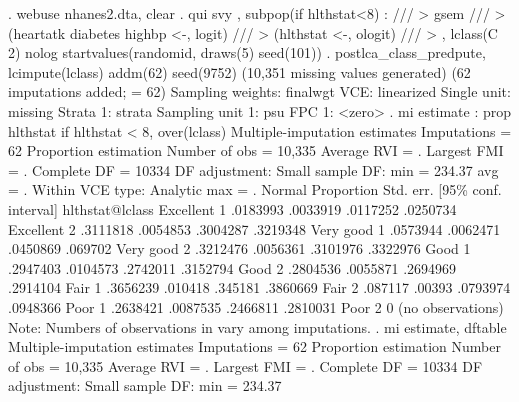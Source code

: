 . webuse nhanes2.dta, clear
{\smallskip}
. qui svy , subpop(if hlthstat<8) : ///
>         gsem ///
>                 (heartatk diabetes highbp <-, logit) ///
>                 (hlthstat <-, ologit) /// 
>         , lclass(C 2) nolog  startvalues(randomid, draws(5) seed(101)) 
{\smallskip}
. postlca_class_predpute, lcimpute(lclass) addm(62) seed(9752)
(10,351 missing values generated)
(62 imputations added; {} = 62)
{\smallskip}
Sampling weights: finalwgt
             VCE: linearized
     Single unit: missing
        Strata 1: strata
 Sampling unit 1: psu
           FPC 1: <zero>
{\smallskip}
. mi estimate : prop hlthstat if hlthstat < 8, over(lclass) 
{\smallskip}
Multiple-imputation estimates     Imputations     =         62
Proportion estimation             Number of obs   =     10,335
                                  Average RVI     =          .
                                  Largest FMI     =          .
                                  Complete DF     =      10334
DF adjustment:   Small sample     DF:     min     =     234.37
                                          avg     =          .
Within VCE type:     Analytic             max     =          .
{\smallskip}
                {\VBAR}                                   Normal
                {\VBAR} Proportion   Std. err.     [95\% conf. interval]
hlthstat@lclass {\VBAR}
   Excellent 1  {\VBAR}   .0183993   .0033919      .0117252    .0250734
   Excellent 2  {\VBAR}   .3111818   .0054853      .3004287    .3219348
   Very good 1  {\VBAR}   .0573944   .0062471      .0450869     .069702
   Very good 2  {\VBAR}   .3212476   .0056361      .3101976    .3322976
        Good 1  {\VBAR}   .2947403   .0104573      .2742011    .3152794
        Good 2  {\VBAR}   .2804536   .0055871      .2694969    .2914104
        Fair 1  {\VBAR}   .3656239    .010418       .345181    .3860669
        Fair 2  {\VBAR}    .087117     .00393      .0793974    .0948366
        Poor 1  {\VBAR}   .2638421   .0087535      .2466811    .2810031
        Poor 2  {\VBAR}          0  (no observations)
Note: Numbers of observations in {} vary among imputations.
{\smallskip}
. mi estimate, dftable
{\smallskip}
Multiple-imputation estimates     Imputations     =         62
Proportion estimation             Number of obs   =     10,335
                                  Average RVI     =          .
                                  Largest FMI     =          .
                                  Complete DF     =      10334
DF adjustment:   Small sample     DF:     min     =     234.37
